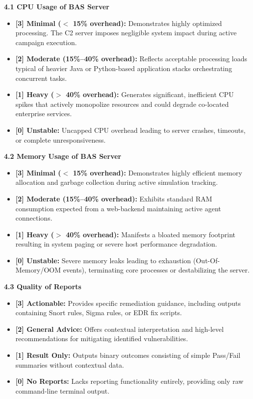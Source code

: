\begin{description}
    \textbf{4.1 CPU Usage of BAS Server}
    \begin{itemize}
        \item \textbf{[3] Minimal ($<$ 15\% overhead):} Demonstrates highly optimized processing. The C2 server imposes negligible system impact during active campaign execution.
        \item \textbf{[2] Moderate (15\%--40\% overhead):} Reflects acceptable processing loads typical of heavier Java or Python-based application stacks orchestrating concurrent tasks.
        \item \textbf{[1] Heavy ($>$ 40\% overhead):} Generates significant, inefficient CPU spikes that actively monopolize resources and could degrade co-located enterprise services.
        \item \textbf{[0] Unstable:} Uncapped CPU overhead leading to server crashes, timeouts, or complete unresponsiveness.
    \end{itemize}
    \textbf{4.2 Memory Usage of BAS Server}
    \begin{itemize}
        \item \textbf{[3] Minimal ($<$ 15\% overhead):} Demonstrates highly efficient memory allocation and garbage collection during active simulation tracking.
        \item \textbf{[2] Moderate (15\%--40\% overhead):} Exhibits standard RAM consumption expected from a web-backend maintaining active agent connections.
        \item \textbf{[1] Heavy ($>$ 40\% overhead):} Manifests a bloated memory footprint resulting in system paging or severe host performance degradation.
        \item \textbf{[0] Unstable:} Severe memory leaks leading to exhaustion (Out-Of-Memory/OOM events), terminating core processes or destabilizing the server.
    \end{itemize}
    \textbf{4.3 Quality of Reports}
    \begin{itemize}
        \item \textbf{[3] Actionable:} Provides specific remediation guidance, including outputs containing Snort rules, Sigma rules, or EDR fix scripts.
        \item \textbf{[2] General Advice:} Offers contextual interpretation and high-level recommendations for mitigating identified vulnerabilities.
        \item \textbf{[1] Result Only:} Outputs binary outcomes consisting of simple Pass/Fail summaries without contextual data.
        \item \textbf{[0] No Reports:} Lacks reporting functionality entirely, providing only raw command-line terminal output.
    \end{itemize}


\end{description}
